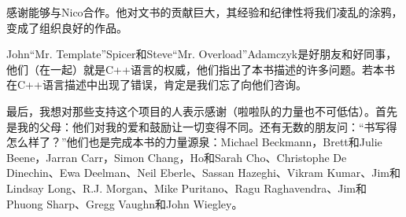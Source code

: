 感谢能够与Nico合作。他对文书的贡献巨大，其经验和纪律性将我们凌乱的涂鸦，变成了组织良好的作品。

John“Mr. Template”Spicer和Steve“Mr. Overload”Adamczyk是好朋友和好同事，他们（在一起）就是C++语言的权威，他们指出了本书描述的许多问题。若本书在C++语言描述中出现了错误，肯定是我们忘了向他们咨询。

最后，我想对那些支持这个项目的人表示感谢（啦啦队的力量也不可低估）。首先是我的父母：他们对我的爱和鼓励让一切变得不同。还有无数的朋友问：“书写得怎么样了？”他们也是完成本书的力量源泉：Michael Beckmann，Brett和Julie Beene，Jarran Carr，Simon Chang，Ho和Sarah Cho、Christophe De Dinechin、Ewa Deelman、Neil Eberle、Sassan Hazeghi、Vikram Kumar、Jim和Lindsay Long、R.J. Morgan、Mike Puritano、Ragu Raghavendra、Jim和Phuong Sharp、Gregg Vaughn和John Wiegley。



